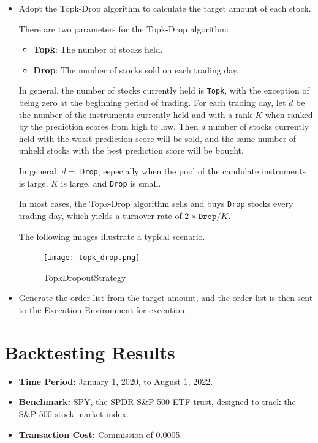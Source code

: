\documentclass[conference]{IEEEtran}
\begin{document}
\begin{itemize}
    \item Adopt the Topk-Drop algorithm to calculate the target amount of each stock.
    
    There are two parameters for the Topk-Drop algorithm:
    \begin{itemize}
        \item \textbf{Topk}: The number of stocks held.
        \item \textbf{Drop}: The number of stocks sold on each trading day.
    \end{itemize}
    
    In general, the number of stocks currently held is \texttt{Topk}, with the exception of being zero at the beginning period of trading. 
    For each trading day, let $d$ be the number of the instruments currently held and with a rank $K$ when ranked by the prediction scores from high to low. 
    Then $d$ number of stocks currently held with the worst prediction score will be sold, and the same number of unheld stocks with the best prediction score will be bought.
    
    In general, $d=$ \texttt{Drop}, especially when the pool of the candidate instruments is large, $K$ is large, and \texttt{Drop} is small.
    
    In most cases, the Topk-Drop algorithm sells and buys \texttt{Drop} stocks every trading day, which yields a turnover rate of $2 \times \texttt{Drop} / K$.
    
    The following images illustrate a typical scenario.

    \begin{figure}[h]
        \centering
        \texttt{[image: topk\_drop.png]}
        \caption{TopkDropoutStrategy}
        \label{fig:TopkDropoutStrategy}
    \end{figure}

    \item Generate the order list from the target amount, and the order list is then sent to the Execution Environment for execution.
\end{itemize}

\section{\textbf{Backtesting Results}}

\begin{itemize}
    \item \textbf{Time Period:} January 1, 2020, to August 1, 2022.
    \item \textbf{Benchmark:} SPY, the SPDR S\&P 500 ETF trust, designed to track the S\&P 500 stock market index.
    \item \textbf{Transaction Cost:} Commission of 0.0005.
\end{itemize}
\end{document}
